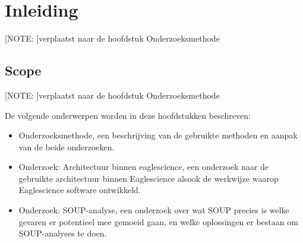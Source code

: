 
\chapter{Inleiding}\label{ch:inleiding3} %


\label{inOnderzoek} %

[NOTE: ]verplaatst naar de hoofdstuk Onderzoeksmethode

\section{Scope}\label{sec:scope}
[NOTE: ]verplaatst naar de hoofdstuk Onderzoeksmethode



De volgende onderwerpen worden in deze hoofdstukken beschreven:
\begin{itemize}
    \item Onderzoeksmethode, een beschrijving van de gebruikte methoden en aanpak van de beide onderzoeken.
    \item Onderzoek: Architectuur binnen eaglescience, een onderzoek naar de gebruikte architectuur binnen Eaglescience alsook de werkwijze waarop Eaglescience software ontwikkeld.
    \item Onderzoek: SOUP-analyse, een onderzoek over wat SOUP precies is welke gevaren er potentieel mee gemoeid gaan, en welke oplossingen er bestaan om SOUP-analyses te doen.
\end{itemize}
